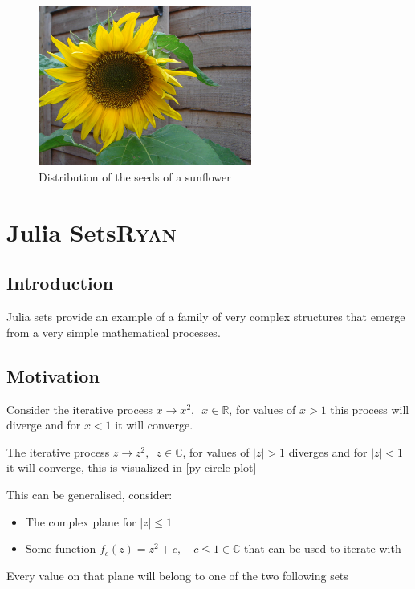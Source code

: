 \documentclass[a4paper,11pt,twoside]{article}
\begin{document}
\begin{figure}[htbp]
\centering
\includegraphics[width=7cm]{media/sunflower.jpg}
\caption{\label{sunflower}Distribution of the seeds of a sunflower \cite{simonbrassCCSearch2006}}
\end{figure}

\section{Julia Sets\hfill{}\textsc{Ryan}}
\label{sec:orgaea4d23}
\subsection{Introduction}
\label{sec:orgf52d07f}
Julia sets provide an example of a family of very complex structures that emerge from a very simple mathematical processes.
\subsection{Motivation}
\label{sec:orgd9c1543}
Consider the iterative process \(x \rightarrow x^{2}, \enspace x \in \mathbb{R}\),
for values of \(x>1\) this process will diverge and for \(x<1\) it will converge.

The iterative process \(z \rightarrow z^{2}, \enspace z \in \mathbb{C}\),
for values of \(\left\lvert z \right\rvert >1\) diverges and for \(\left\lvert z \right\rvert <1\) it will converge, this is visualized in \ref{py-circle-plot}

This can be generalised, consider:

\begin{itemize}
\item The complex plane for \(\left\lvert z \right\rvert \leq 1\)
\item Some function \(f_{c}(z) = z^{2} + c, \quad c \leq 1 \in \mathbb{C}\) that can be used to iterate with
\end{itemize}

Every value on that plane will belong to one of the two following sets
\end{document}
